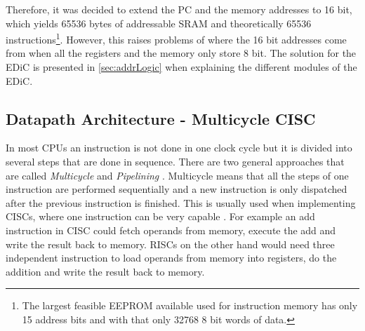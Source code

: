 Therefore, it was decided to extend the \gls{PC} and the memory addresses to 16 bit, which yields 65536 bytes of addressable \gls{SRAM} and theoretically 65536 instructions\footnote{The largest feasible \gls{EEPROM} available used for instruction memory has only 15 address bits and with that only 32768 8 bit words of data.}.
However, this raises problems of where the 16 bit addresses come from when all the registers and the memory only store 8 bit.
The solution for the \gls{EDiC} is presented in \cref{sec:addrLogic} when explaining the different modules of the \gls{EDiC}.

\subsection{Datapath Architecture - Multicycle CISC}\label{sec:cisc}
In most \glspl{CPU} an instruction is not done in one clock cycle but it is divided into several steps that are done in sequence.
There are two general approaches that are called \emph{Multicycle} and \emph{Pipelining} \cite{PattersonDavid2016RuRD}.
Multicycle means that all the steps of one instruction are performed sequentially and a new instruction is only dispatched after the previous instruction is finished.
This is usually used when implementing \glspl{CISC}, where one instruction can be very capable \cite{chen_novick_shimano_2000}.
For example an add instruction in \gls{CISC} could fetch operands from memory, execute the add and write the result back to memory.
\glspl{RISC} on the other hand would need three independent instruction to load operands from memory into registers, do the addition and write the result back to memory.


